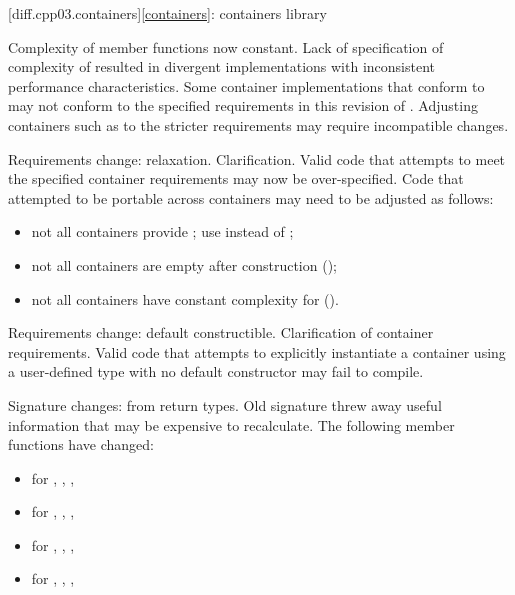 [diff.cpp03.containers]{\ref*{containers}: containers library}

\change
Complexity of  member functions now constant.
\rationale
Lack of specification of complexity of  resulted in
divergent implementations with inconsistent performance characteristics.
\effect
Some container implementations that conform to \CppIII{} may not conform to the
specified  requirements in this revision of \Cpp{}. Adjusting
containers such as  to the stricter requirements may require
incompatible changes.

\change
Requirements change: relaxation.
\rationale
Clarification.
\effect
Valid \CppIII{} code that attempts to meet the specified container requirements
may now be over-specified. Code that attempted to be portable across containers
may need to be adjusted as follows:
\begin{itemize}
\item not all containers provide ; use  instead
of ;
\item not all containers are empty after construction ();
\item not all containers have constant complexity for  ().
\end{itemize}

\change
Requirements change: default constructible.
\rationale
Clarification of container requirements.
\effect
Valid \CppIII{} code that attempts to explicitly instantiate a container using
a user-defined type with no default constructor may fail to compile.

\change
Signature changes: from  return types.
\rationale
Old signature threw away useful information that may be expensive
to recalculate.
\effect
The following member functions have changed:
\begin{itemize}
\item {} for , , , 
\item {} for , , , 
\item {} for , , , 
\item {} for , , , 
\end{itemize}

